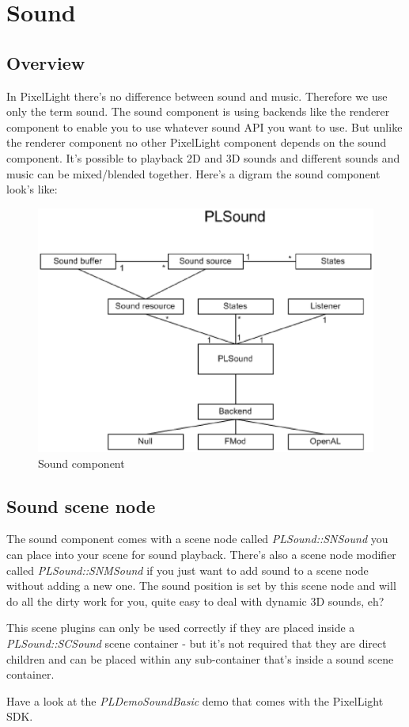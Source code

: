 \chapter{Sound}




\section{Overview}
In PixelLight there's no difference between sound and music. Therefore we use only the term sound. The sound component is using backends like the renderer component to enable you to use whatever sound API you want to use. But unlike the renderer component no other PixelLight component depends on the sound component. It's possible to playback 2D and 3D sounds and different sounds and music can be mixed/blended together. Here's a digram the sound component look's like:\\
\begin{figure}
  \begin{center}
    \includegraphics{pics/PLSoundClassDiagram.eps}
  \end{center}
  \caption{Sound component}
  \label{fig:Sound component high-level UML class diagram}
\end{figure}




\section{Sound scene node}
The sound component comes with a scene node called \emph{PLSound::SNSound} you can place into your scene for sound playback. There's also a scene node modifier called \emph{PLSound::SNMSound} if you just want to add sound to a scene node without adding a new one. The sound position is set by this scene node and will do all the dirty work for you, quite easy to deal with dynamic 3D sounds, eh?

This scene plugins can only be used correctly if they are placed inside a \emph{PLSound::SCSound} scene container - but it's not required that they are direct children and can be placed within any sub-container that's inside a sound scene container.

Have a look at the \emph{PLDemoSoundBasic} demo that comes with the PixelLight SDK.
